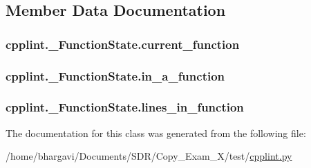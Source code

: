 \subsection{Member Data Documentation}
\subsubsection[{\texorpdfstring{current\+\_\+function}{current_function}}]{\setlength{\rightskip}{0pt plus 5cm}cpplint.\+\_\+\+Function\+State.\+current\+\_\+function}\hypertarget{classcpplint_1_1___function_state_a320674f54bd75087febc8f0d83620569}{}\label{classcpplint_1_1___function_state_a320674f54bd75087febc8f0d83620569}
\subsubsection[{\texorpdfstring{in\+\_\+a\+\_\+function}{in_a_function}}]{\setlength{\rightskip}{0pt plus 5cm}cpplint.\+\_\+\+Function\+State.\+in\+\_\+a\+\_\+function}\hypertarget{classcpplint_1_1___function_state_a8362d472591f60462184bf68b49c0efb}{}\label{classcpplint_1_1___function_state_a8362d472591f60462184bf68b49c0efb}
\subsubsection[{\texorpdfstring{lines\+\_\+in\+\_\+function}{lines_in_function}}]{\setlength{\rightskip}{0pt plus 5cm}cpplint.\+\_\+\+Function\+State.\+lines\+\_\+in\+\_\+function}\hypertarget{classcpplint_1_1___function_state_a886f5d476adc81f499a711750a399aa2}{}\label{classcpplint_1_1___function_state_a886f5d476adc81f499a711750a399aa2}


The documentation for this class was generated from the following file\+:\begin{DoxyCompactItemize}
\item 
/home/bhargavi/\+Documents/\+S\+D\+R/\+Copy\+\_\+\+Exam\+\_\+X/test/\hyperlink{cpplint_8py}{cpplint.\+py}\end{DoxyCompactItemize}
